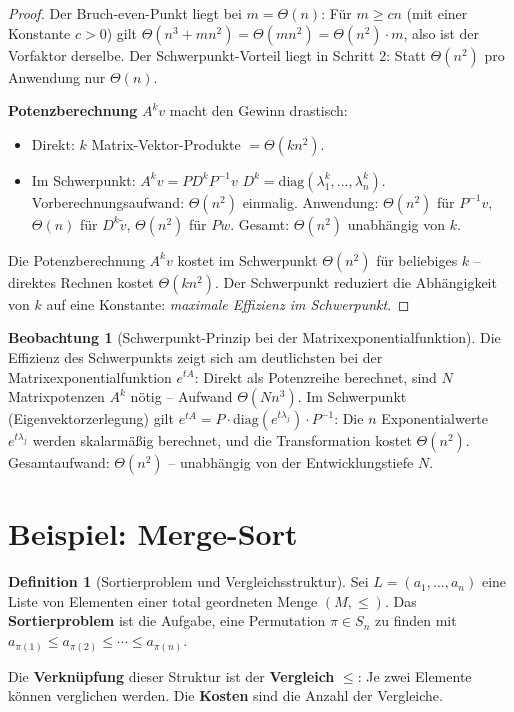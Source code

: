 ﻿\documentclass[a4paper,12pt]{report}
\theoremstyle{definition}
\newtheorem{definition}{Definition}
\newtheorem{beobachtung}{Beobachtung}
\begin{document}
\begin{proof}
    Der Bruch-even-Punkt liegt bei $m = \Theta(n)$: Für $m \geq cn$
    (mit einer Konstante $c > 0$) gilt
    $\Theta(n^3 + mn^2) = \Theta(mn^2) = \Theta(n^2) \cdot m$,
    also ist der Vorfaktor derselbe. Der Schwerpunkt-Vorteil liegt
    in Schritt 2: Statt $\Theta(n^2)$ pro Anwendung nur $\Theta(n)$.

    \textbf{Potenzberechnung} $A^k v$ macht den Gewinn drastisch:
    \begin{itemize}
        \item[-] Direkt: $k$ Matrix-Vektor-Produkte $= \Theta(kn^2)$.
        \item[-] Im Schwerpunkt: $A^k v = P D^k P^{-1} v$
              $D^k = \mathrm{diag}(\lambda_1^k, \ldots, \lambda_n^k)$.
              Vorberechnungsaufwand: $\Theta(n^2)$ einmalig.
              Anwendung: $\Theta(n^2)$ für $P^{-1}v$, $\Theta(n)$
              für $D^k \tilde{v}$, $\Theta(n^2)$ für $Pw$.
              Gesamt: $\Theta(n^2)$ unabhängig von $k$.
    \end{itemize}
    Die Potenzberechnung $A^k v$ kostet im Schwerpunkt $\Theta(n^2)$
    für beliebiges $k$ -- direktes Rechnen kostet $\Theta(kn^2)$.
    Der Schwerpunkt reduziert die Abhängigkeit von $k$ auf eine
    Konstante: \emph{maximale Effizienz im Schwerpunkt}.
\end{proof}

\begin{beobachtung}[Schwerpunkt-Prinzip bei der Matrixexponentialfunktion]
    Die Effizienz des Schwerpunkts zeigt sich am deutlichsten bei
    der Matrixexponentialfunktion $e^{tA}$: Direkt als Potenzreihe
    berechnet, sind $N$ Matrixpotenzen $A^k$ nötig -- Aufwand
    $\Theta(Nn^3)$. Im Schwerpunkt (Eigenvektorzerlegung) gilt
    $e^{tA} = P \cdot \mathrm{diag}(e^{t\lambda_j}) \cdot P^{-1}$:
    Die $n$ Exponentialwerte $e^{t\lambda_j}$ werden skalarmäßig
    berechnet, und die Transformation kostet $\Theta(n^2)$.
    Gesamtaufwand: $\Theta(n^2)$ -- unabhängig von der Entwicklungstiefe $N$.
\end{beobachtung}

\section{Beispiel: Merge-Sort}

\begin{definition}[Sortierproblem und Vergleichsstruktur]
    Sei $L = (a_1, \ldots, a_n)$ eine Liste von Elementen einer
    total geordneten Menge $(M, \leq)$. Das \textbf{Sortierproblem}
    ist die Aufgabe, eine Permutation $\pi \in S_n$ zu finden mit
    $a_{\pi(1)} \leq a_{\pi(2)} \leq \cdots \leq a_{\pi(n)}$.

    Die \textbf{Verknüpfung} dieser Struktur ist der
    \textbf{Vergleich} $\leq$: Je zwei Elemente können verglichen werden.
    Die \textbf{Kosten} sind die Anzahl der Vergleiche.
\end{definition}
\end{document}
